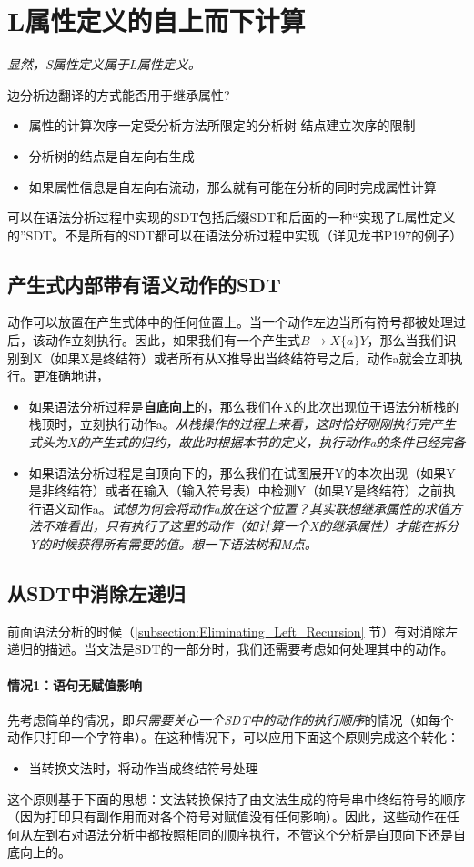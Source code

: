 \documentclass[]{report}
\newcommand{\myCoral}{\color[HTML]{FF7F50}} %
\begin{document}
	\section{L属性定义的自上而下计算}
	\textit{显然，S属性定义属于L属性定义。}\par
	边分析边翻译的方式能否用于继承属性?
	\begin{itemize}
		\item 属性的计算次序一定受分析方法所限定的分析树 结点建立次序的限制
		\item 分析树的结点是自左向右生成
		\item 如果属性信息是自左向右流动，那么就有可能在分析的同时完成属性计算
	\end{itemize}\par
	可以在语法分析过程中实现的SDT包括后缀SDT和后面的一种“实现了L属性定义的”SDT。不是所有的SDT都可以在语法分析过程中实现（详见龙书P197的例子）
		\subsection{产生式内部带有语义动作的SDT}
		动作可以放置在产生式体中的任何位置上。当一个动作左边当所有符号都被处理过后，该动作立刻执行。因此，如果我们有一个产生式$B\to X\{a\}Y$，那么当我们识别到X（如果X是终结符）或者所有从X推导出当终结符号之后，动作a就会立即执行。更准确地讲，
		\begin{itemize}
			\item 如果语法分析过程是\textbf{自底向上}的，那么我们在X的此次出现位于语法分析栈的栈顶时，立刻执行动作a。\textit{从栈操作的过程上来看，这时恰好刚刚执行完{\myCoral 产生式头}为X的产生式的归约，故此时根据本节的定义，执行动作a的条件已经完备}
			\item 如果语法分析过程是自顶向下的，那么我们在试图展开Y的本次出现（如果Y是非终结符）或者在输入（输入符号表）中检测Y（如果Y是终结符）之前执行语义动作a。\textit{试想为何会将动作a放在这个位置？其实联想继承属性的求值方法不难看出，只有执行了这里的动作（如计算一个X的继承属性）才能在拆分Y的时候获得所有需要的值。想一下语法树和M点。}
		\end{itemize}
		\subsection{从SDT中消除左递归}
		前面语法分析的时候（\ref{subsection:Eliminating_Left_Recursion} 节）有对消除左递归的描述。当文法是SDT的一部分时，我们还需要考虑如何处理其中的动作。\par
			\paragraph{情况1：语句无赋值影响}
			先考虑简单的情况，即\textit{只需要关心一个SDT中的动作的执行顺序}的情况（如每个动作只打印一个字符串）。在这种情况下，可以应用下面这个原则完成这个转化：
			\begin{itemize}
				\item 当转换文法时，将动作当成终结符号处理
			\end{itemize}\par
			这个原则基于下面的思想：文法转换保持了由文法生成的符号串中终结符号的顺序（因为打印只有副作用而对各个符号对赋值没有任何影响）。因此，这些动作在任何从左到右对语法分析中都按照相同的顺序执行，不管这个分析是自顶向下还是自底向上的。
\end{document}
